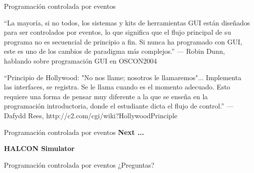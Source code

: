 \documentclass[11pt]{beamer}
\begin{document}
\begin{frame}{Programación controlada por eventos}
	
	``La mayoría, si no todos, los sistemas y kits de herramientas GUI están diseñados para ser controlados por eventos, lo que significa que el flujo principal de su programa no es secuencial de principio a fin. Si nunca ha programado con GUI, este es uno de los cambios de paradigma más complejos.''\newline
	— Robin Dunn, hablando sobre programación GUI en OSCON2004\newline
	
	``Principio de Hollywood: "No nos llame; nosotros le llamaremos"... Implementa las interfaces, se registra. Se le llama cuando es el momento adecuado. Esto requiere una forma de pensar muy diferente a la que se enseña en la programación introductoria, donde el estudiante dicta el flujo de control.''\newline
	— Dafydd Rees, http://c2.com/cgi/wiki?HollywoodPrinciple
	
\end{frame}	


\begin{frame}{Programación controlada por eventos}
	\textbf{Next ...}\newline

	\textbf{HALCON Simulator}
\end{frame}	


\begin{frame}{Programación controlada por eventos}
	\Huge
	\centering
	¿Preguntas?
\end{frame}	
\end{document}
